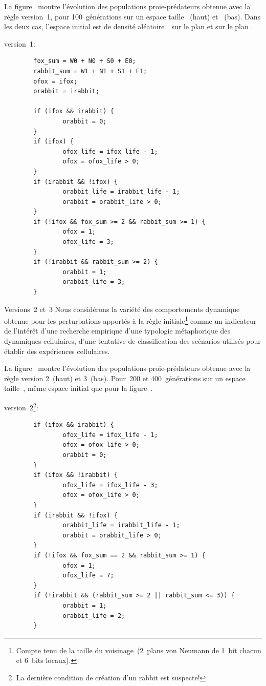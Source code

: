 La figure~ montre l'évolution des
populations proie-prédateurs obtenue avec la règle 
version~1, pour 100~générations sur un espace taille ~(haut)
et ~(bas). %
Dans les deux cas, l'espace initial est de densité aléatoire\,\undemi~%
sur le plan  et sur le plan .

\medskip
\large
{} version~1:
\normalsize

\footnotesize
\begin{verbatim}
        fox_sum = W0 + N0 + S0 + E0;
        rabbit_sum = W1 + N1 + S1 + E1;
        ofox = ifox;
        orabbit = irabbit;

        if (ifox && irabbit) {
                orabbit = 0;
        }
        if (ifox) {
                ofox_life = ifox_life - 1;
                ofox = ofox_life > 0;
        } 
        if (irabbit && !ifox) {
                orabbit_life = irabbit_life - 1;
                orabbit = orabbit_life > 0;
        }
        if (!ifox && fox_sum >= 2 && rabbit_sum >= 1) {
                ofox = 1;
                ofox_life = 3;
        }
        if (!irabbit && rabbit_sum >= 2) {
                orabbit = 1;
                orabbit_life = 3;
        }
\end{verbatim}
\normalsize

%
{}%
{ Versions~2 et~3}%
{Nous considérons la variété des comportements dynamique obtenue pour
  les perturbations apportés à la règle initiale\footnote{%
    Compte tenu de la taille du voisinage~(2~plans von Neumann de
    1~bit chacun et 6~bits locaux).} comme un indicateur de l'intérêt
  d'une recherche empirique d'une typologie métaphorique des
  dynamiques cellulaires, \ie d'une tentative de classification des
  scénarios utilisés pour établir des expériences cellulaires.}

La figure~ montre l'évolution des
populations proie-prédateurs obtenue avec la règle 
version 2~(haut) et 3~(bas). %
Pour~200 et 400~générations sur un espace taille~, même
espace initial que pour la figure~.

\medskip
\large
{} version~2\footnote{%
  La dernière condition de
  création d'un rabbit est suspecte!}:
\normalsize

\footnotesize
\begin{verbatim}
        if (ifox && irabbit) {
                ofox_life = ifox_life - 1;
                ofox = ofox_life > 0;
                orabbit = 0;
        }
        if (ifox && !irabbit) {
                ofox_life = ifox_life - 3;
                ofox = ofox_life > 0;
        } 
        if (irabbit && !ifox) {
                orabbit_life = irabbit_life - 1;
                orabbit = orabbit_life > 0;
        }
        if (!ifox && fox_sum == 2 && rabbit_sum >= 1) {
                ofox = 1;
                ofox_life = 7;
        }
        if (!irabbit && (rabbit_sum >= 2 || rabbit_sum <= 3)) {
                orabbit = 1;
                orabbit_life = 2;
        }
\end{verbatim}
\normalsize

